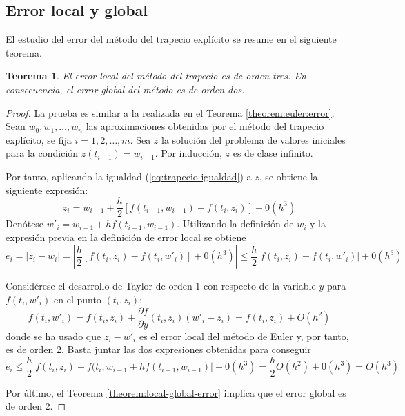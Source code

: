 \documentclass{article}
\theoremstyle{theorem-style}  %
\newtheorem{theorem}{Teorema}[section]  %
\theoremstyle{definition-style}
\theoremstyle{example-style}
\begin{document}
	\subsection{Error local y global} \label{sec:trapecio-explicito:error}
	
		El estudio del error del método del trapecio explícito se resume en el siguiente teorema.
	
		\begin{theorem}
			El error local del método del trapecio es de orden tres. En consecuencia, el error global del método es de orden dos. 
		\end{theorem}

		\begin{proof}
			La prueba es similar a la realizada en el Teorema \ref{theorem:euler:error}. Sean $w_0, w_1, \ldots, w_n$ las aproximaciones obtenidas por el método del trapecio explícito, se fija $i = 1, 2, \ldots, m$. Sea $z$ la solución del problema de valores iniciales para la condición $z(t_{i-1}) = w_{i-1}$. Por inducción, $z$ es de clase infinito.

			Por tanto, aplicando la igualdad (\ref{eq:trapecio-igualdad}) a $z$, se obtiene la siguiente expresión:
			$$ z_i = w_{i-1} + \frac{h}{2} \left[f(t_{i-1},w_{i-1}) + f(t_i, z_i)\right] + 0(h^3) $$
			Denótese $w'_i =  w_{i-1} + hf(t_{i-1}, w_{i-1})$. Utilizando la definición de $w_i$ y la expresión previa en la definición de error local se obtiene			
			$$ e_i = \left|z_i - w_i\right| =  \left|\frac{h}{2} \left[f(t_i, z_i) - f(t_i, w'_i)\right] + 0(h^3) \right| \le \frac{h}{2} \left|f(t_i, z_i) - f(t_i, w'_i)\right| + 0(h^3) $$ 

			Considérese el desarrollo de Taylor de orden 1 con respecto de la variable $y$ para $f(t_i, w'_i)$ en el punto $(t_i,z_i)$:
			$$ f(t_i, w'_i) = f(t_i, z_i) + \frac{\partial f}{\partial y}(t_i, z_i) (w'_i - z_i) = f(t_i, z_i) + O(h^2) $$
			donde se ha usado que $z_i - w'_i$ es el error local del método de Euler y, por tanto, es de orden 2. Basta juntar las dos expresiones obtenidas para conseguir
			$$ e_i \le \frac{h}{2} \left|f(t_i, z_i) - f(t_i, w_{i-1} + hf(t_{i-1}, w_{i-1})\right| + 0(h^3) =  \frac{h}{2} O(h^2) + 0(h^3) = O(h^3) $$ 
			
			Por último, el Teorema \ref{theorem:local-global-error} implica que el error global es de orden 2.

		\end{proof}
\end{document}
